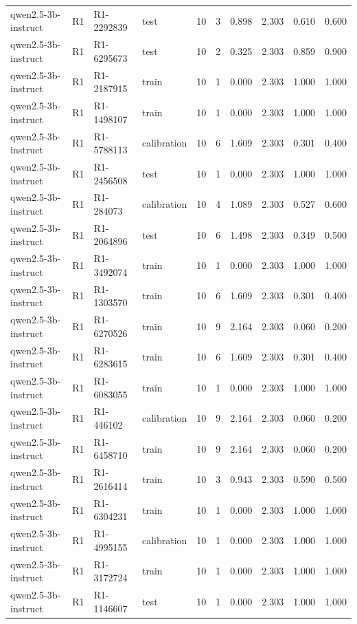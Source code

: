 \begin{table}
\begin{tabular}{llllrrrrrr}
qwen2.5-3b-instruct & R1 & R1-2292839 & test & 10 & 3 & 0.898 & 2.303 & 0.610 & 0.600 \\
qwen2.5-3b-instruct & R1 & R1-6295673 & test & 10 & 2 & 0.325 & 2.303 & 0.859 & 0.900 \\
qwen2.5-3b-instruct & R1 & R1-2187915 & train & 10 & 1 & 0.000 & 2.303 & 1.000 & 1.000 \\
qwen2.5-3b-instruct & R1 & R1-1498107 & train & 10 & 1 & 0.000 & 2.303 & 1.000 & 1.000 \\
qwen2.5-3b-instruct & R1 & R1-5788113 & calibration & 10 & 6 & 1.609 & 2.303 & 0.301 & 0.400 \\
qwen2.5-3b-instruct & R1 & R1-2456508 & test & 10 & 1 & 0.000 & 2.303 & 1.000 & 1.000 \\
qwen2.5-3b-instruct & R1 & R1-284073 & calibration & 10 & 4 & 1.089 & 2.303 & 0.527 & 0.600 \\
qwen2.5-3b-instruct & R1 & R1-2064896 & test & 10 & 6 & 1.498 & 2.303 & 0.349 & 0.500 \\
qwen2.5-3b-instruct & R1 & R1-3492074 & train & 10 & 1 & 0.000 & 2.303 & 1.000 & 1.000 \\
qwen2.5-3b-instruct & R1 & R1-1303570 & train & 10 & 6 & 1.609 & 2.303 & 0.301 & 0.400 \\
qwen2.5-3b-instruct & R1 & R1-6270526 & train & 10 & 9 & 2.164 & 2.303 & 0.060 & 0.200 \\
qwen2.5-3b-instruct & R1 & R1-6283615 & train & 10 & 6 & 1.609 & 2.303 & 0.301 & 0.400 \\
qwen2.5-3b-instruct & R1 & R1-6083055 & train & 10 & 1 & 0.000 & 2.303 & 1.000 & 1.000 \\
qwen2.5-3b-instruct & R1 & R1-446102 & calibration & 10 & 9 & 2.164 & 2.303 & 0.060 & 0.200 \\
qwen2.5-3b-instruct & R1 & R1-6458710 & train & 10 & 9 & 2.164 & 2.303 & 0.060 & 0.200 \\
qwen2.5-3b-instruct & R1 & R1-2616414 & train & 10 & 3 & 0.943 & 2.303 & 0.590 & 0.500 \\
qwen2.5-3b-instruct & R1 & R1-6304231 & train & 10 & 1 & 0.000 & 2.303 & 1.000 & 1.000 \\
qwen2.5-3b-instruct & R1 & R1-4995155 & calibration & 10 & 1 & 0.000 & 2.303 & 1.000 & 1.000 \\
qwen2.5-3b-instruct & R1 & R1-3172724 & train & 10 & 1 & 0.000 & 2.303 & 1.000 & 1.000 \\
qwen2.5-3b-instruct & R1 & R1-1146607 & test & 10 & 1 & 0.000 & 2.303 & 1.000 & 1.000 \\

\end{tabular}
\end{table}
